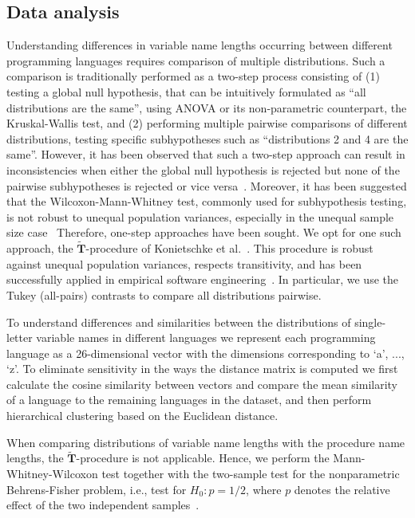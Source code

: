 \documentclass[conference]{IEEEtran}
\begin{document}
\subsection{Data analysis}
\label{sec:da}
Understanding differences in variable name lengths occurring between different programming languages requires comparison of multiple distributions. 
Such a comparison is traditionally performed as a two-step process consisting of (1) testing a global null hypothesis, that can be intuitively formulated as ``all distributions are the same'', using ANOVA or its non-parametric counterpart, the Kruskal-Wallis test, and (2) performing multiple pairwise comparisons of different distributions, testing specific subhypotheses such as ``distributions 2 and 4 are the same''. 
However, it has been observed that such a two-step approach can result in inconsistencies when either the global null hypothesis is rejected but none of the pairwise subhypotheses is rejected or vice versa~\cite{Gabriel}. 
Moreover, it has been suggested that the Wilcoxon-Mann-Whitney test, commonly used for subhypothesis testing, is not robust to unequal population variances, especially in the unequal sample size case~\cite{Zimmerman:Zumbo}
Therefore, one-step approaches have been sought.
We opt for one such approach, the $\widetilde{\mathbf{T}}$-procedure of Konietschke et al.~\cite{Konietschke:Hothorn:Brunner,Konietschke:nparcomp}. 
This procedure is robust against unequal population variances, respects transitivity, and has been successfully applied in empirical software engineering~\cite{VasilescuSGM14,VasilescuCS14,YuWYW16}.
In particular, we use the Tukey (all-pairs) contrasts to compare all distributions pairwise.

To understand differences and similarities between the distributions of single-letter variable names in different languages we represent each programming language as a 26-dimensional vector with the dimensions corresponding to `a', ..., `z'.
To eliminate sensitivity in the ways the distance matrix is computed we first calculate the cosine similarity between vectors and compare the mean similarity of a language to the remaining languages in the dataset, and then perform hierarchical clustering based  on the Euclidean distance.

When comparing distributions of variable name lengths with the procedure name lengths, the $\widetilde{\mathbf{T}}$-procedure is not applicable.
Hence, we perform the Mann-Whitney-Wilcoxon test together with the two-sample test for the nonparametric Behrens-Fisher problem, i.e., test for
$H_0: p = 1/2$, where $p$ denotes the relative effect of the two independent samples~\cite{Neubert,Konietschke:nparcomp}.
\end{document}
